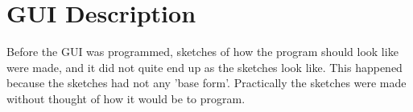 \section{GUI Description}

Before the GUI was programmed, sketches of how the program should look like were made, and it did not quite end up as the sketches look like. This happened because the sketches had not any 'base form'. Practically the sketches were made without thought of how it would be to program. 